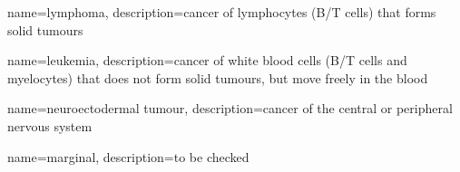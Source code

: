 {
        name=lymphoma,
        description={cancer of lymphocytes (B/T cells) that forms solid tumours}
}

{
        name=leukemia,
        description={cancer of white blood cells (B/T cells and myelocytes) that does not form solid tumours, but move freely in the blood}
}

{
        name=neuroectodermal tumour,
        description={cancer of the central or peripheral nervous system}
}

{
        name=marginal,
        description={to be checked} %
}
